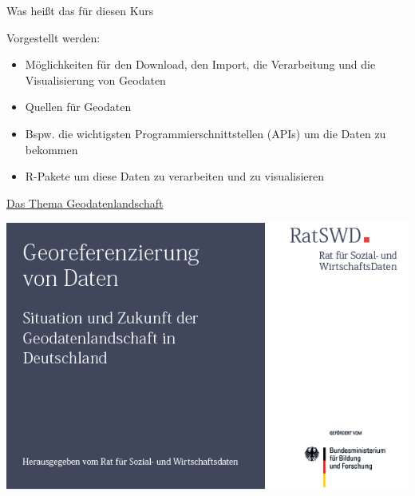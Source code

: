 \documentclass[ignorenonframetext,]{beamer}
\providecommand{\tightlist}{%
  \setlength{\itemsep}{0pt}\setlength{\parskip}{0pt}}
\begin{document}
\begin{frame}{Was heißt das für diesen Kurs}

\begin{block}{Vorgestellt werden:}

\begin{itemize}
\tightlist
\item
  Möglichkeiten für den Download, den Import, die Verarbeitung und die
  Visualisierung von Geodaten
\end{itemize}

\begin{itemize}
\item
  Quellen für Geodaten
\item
  Bspw. die wichtigsten Programmierschnittstellen (APIs) um die Daten zu
  bekommen
\item
  R-Pakete um diese Daten zu verarbeiten und zu visualisieren
\end{itemize}

\end{block}

\end{frame}

\begin{frame}{\href{https://www.ratswd.de/dl/downloads/RatSWD_Geodatenbericht.pdf}{Das
Thema Geodatenlandschaft}}

\includegraphics{figure/BildRatSWDBericht.png}

\end{frame}
\end{document}

